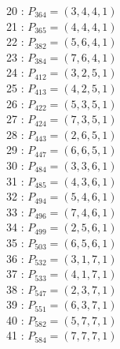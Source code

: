 \documentclass{article}
\begin{document}
{\begin{multicols}{2}
20 : $P_{364}=( 3, 4, 4, 1 )$\\
21 : $P_{365}=( 4, 4, 4, 1 )$\\
22 : $P_{382}=( 5, 6, 4, 1 )$\\
23 : $P_{384}=( 7, 6, 4, 1 )$\\
24 : $P_{412}=( 3, 2, 5, 1 )$\\
25 : $P_{413}=( 4, 2, 5, 1 )$\\
26 : $P_{422}=( 5, 3, 5, 1 )$\\
27 : $P_{424}=( 7, 3, 5, 1 )$\\
28 : $P_{443}=( 2, 6, 5, 1 )$\\
29 : $P_{447}=( 6, 6, 5, 1 )$\\
30 : $P_{484}=( 3, 3, 6, 1 )$\\
31 : $P_{485}=( 4, 3, 6, 1 )$\\
32 : $P_{494}=( 5, 4, 6, 1 )$\\
33 : $P_{496}=( 7, 4, 6, 1 )$\\
34 : $P_{499}=( 2, 5, 6, 1 )$\\
35 : $P_{503}=( 6, 5, 6, 1 )$\\
36 : $P_{532}=( 3, 1, 7, 1 )$\\
37 : $P_{533}=( 4, 1, 7, 1 )$\\
38 : $P_{547}=( 2, 3, 7, 1 )$\\
39 : $P_{551}=( 6, 3, 7, 1 )$\\
40 : $P_{582}=( 5, 7, 7, 1 )$\\
41 : $P_{584}=( 7, 7, 7, 1 )$\\
\end{multicols}
}
\end{document}
